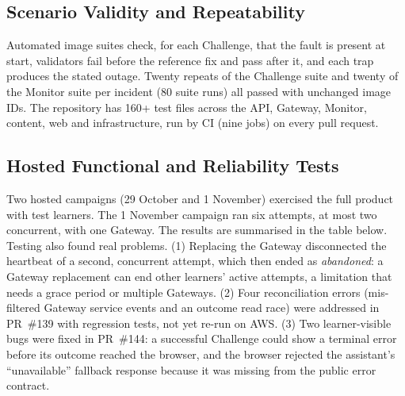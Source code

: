 \documentclass[11pt,a4paper]{article}
\begin{document}
\subsection{Scenario Validity and Repeatability}
Automated image suites check, for each Challenge, that the fault is present at
start, validators fail before the reference fix and pass after it, and each
trap produces the stated outage. Twenty repeats of the Challenge suite and
twenty of the Monitor suite per incident (80 suite runs) all passed with
unchanged image IDs. The repository has 160+ test files across the API,
Gateway, Monitor, content, web and infrastructure, run by CI (nine jobs) on
every pull request.

\subsection{Hosted Functional and Reliability Tests}
\label{sec:hosted}
Two hosted campaigns (29 October and 1 November) exercised the full product
with test learners. The 1 November campaign ran six attempts, at most two
concurrent, with one Gateway. The results are summarised in the table below.
Testing also found real problems. (1) Replacing the Gateway disconnected
the heartbeat of a second, concurrent attempt, which then ended as
\emph{abandoned}: a Gateway replacement can end other learners' active
attempts, a limitation that needs a grace period or multiple Gateways.
(2) Four reconciliation errors (mis-filtered Gateway service events and an
outcome read race) were addressed in PR~\#139 with regression tests, not yet
re-run on AWS. (3) Two learner-visible bugs were fixed in PR~\#144: a successful
Challenge could show a terminal error before its outcome reached the browser,
and the browser rejected the assistant's ``unavailable'' fallback response
because it was missing from the public error contract.
\end{document}
